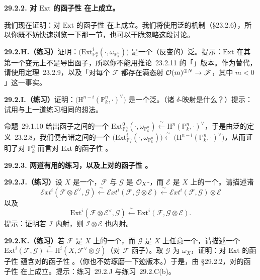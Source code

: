 \textbf{29.2.2. 对 $\mathrm{Ext}$ 的函子性 \trSerreDuality{}在\trProjectiveSpace{}上成立。}

我们现在证明：对 $\mathrm{Ext}$ 的函子性 \trSerreDuality{}在\trProjectiveSpace{}上成立。我们将使用泛\trDeltaFunctor{}的机制（\S23.2.6），所以你既不妨快速浏览一下那一节，也可以干脆忽略这段讨论。

\textbf{29.2.H.（练习）}\quad 证明：$\bigl(\mathrm{Ext}^i_{\mathbb{P}^n_k}(\cdot,\omega_{\mathbb{P}^n_k})\bigr)$ 是一个（反变的）泛\trDeltaFunctor。提示：$\mathrm{Ext}$ 在其第一个变元上不是导出函子，所以你不能用\mbox{推论~23.2.11} 的「\trProjectiveObj」版本。作为替代，请使用\mbox{定理~23.2.9}，以及「对每个 $\mathscr{F}$ 都存在满态射 $\mathcal{O}(m)^{\oplus N}\to\mathscr{F}$，其中 $m<0$」这一事实。

\textbf{29.2.I.（练习）}\quad 证明：$\bigl(\mathrm{H}^{n-i}(\mathbb{P}^n_k,\cdot)^{\vee}\bigr)$ 是一个泛\trDeltaFunctor。（诸 $\delta$-映射是什么？）提示：试用与上一道练习相同的想法。

\mbox{命题~29.1.10} 给出函子之间的一个\trIsomorphism{} $\mathrm{Ext}^0_{\mathbb{P}^n_k}(\cdot,\omega_{\mathbb{P}^n_k})\xleftarrow{\ \sim\ }\mathrm{H}^n(\mathbb{P}^n_k,\cdot)^{\vee}$，于是由泛\trDeltaFunctor{}的\mbox{定义~23.2.8}，我们便有诸\trDeltaFunctor{}之间的一个\trIsomorphism{} $\bigl(\mathrm{Ext}^i_{\mathbb{P}^n_k}(\cdot,\omega_{\mathbb{P}^n_k})\bigr)\xleftarrow{\ \sim\ }\bigl(\mathrm{H}^{n-i}(\mathbb{P}^n_k,\cdot)^{\vee}\bigr)$，从而证明了对 $\mathbb{P}^n_k$ 而言对 $\mathrm{Ext}$ 的函子性 \trSerreDuality。

\textbf{29.2.3. 两道有用的练习，以及\trProjectiveSpace{}上对\trVectorBundle{}的函子性 \trSerreDuality。}

\textbf{29.2.J.（练习）}\quad 设 $X$ 是一个\trRingedSpace，$\mathscr{F}$ 与 $\mathscr{G}$ 是 $\mathcal{O}_X$-\trModule，而 $\mathscr{E}$ 是 $X$ 上的一个\trLocallyFreeSheaf。请描述诸\trIsomorphism
\[
\mathscr{E}xt^i(\mathscr{F}\otimes\mathscr{E}^{\vee},\mathscr{G})\xleftarrow{\ \sim\ }\mathscr{E}xt^i(\mathscr{F},\mathscr{G}\otimes\mathscr{E})\xleftarrow{\ \sim\ }\mathscr{E}xt^i(\mathscr{F},\mathscr{G})\otimes\mathscr{E}
\]
以及
\[
\mathrm{Ext}^i(\mathscr{F}\otimes\mathscr{E}^{\vee},\mathscr{G})\xleftarrow{\ \sim\ }\mathrm{Ext}^i(\mathscr{F},\mathscr{G}\otimes\mathscr{E}).
\]
提示：证明若 $\mathscr{I}$ 内射，则 $\mathscr{I}\otimes\mathscr{E}$ 也内射。

\textbf{29.2.K.（练习）}\quad 若 $\mathscr{F}$ 是\trScheme{} $X$ 上的一个\trLocallyFreeSheaf，而 $\mathscr{G}$ 是 $X$ 上任意一个\trCoherentSheaf，请描述一个\trIsomorphism{} $\mathrm{Ext}^i(\mathscr{F},\mathscr{G})\xleftarrow{\ \sim\ }\mathrm{H}^i(X,\mathscr{F}^{\vee}\otimes\mathscr{G})$（对 $\mathscr{F}$ 函子）。取 $\mathscr{G}$ 为 $\omega_X$，证明：对 $\mathrm{Ext}$ 的函子性 \trSerreDuality{}蕴含对\trVectorBundle{}的函子性 \trSerreDuality。（你也不妨琢磨一下迹版本。）于是，由 \S29.2.2，对\trVectorBundle{}的函子性 \trSerreDuality{}在\trProjectiveSpace{}上成立。提示：\mbox{练习~29.2.J} 与\mbox{练习~29.2.C(b)}。

